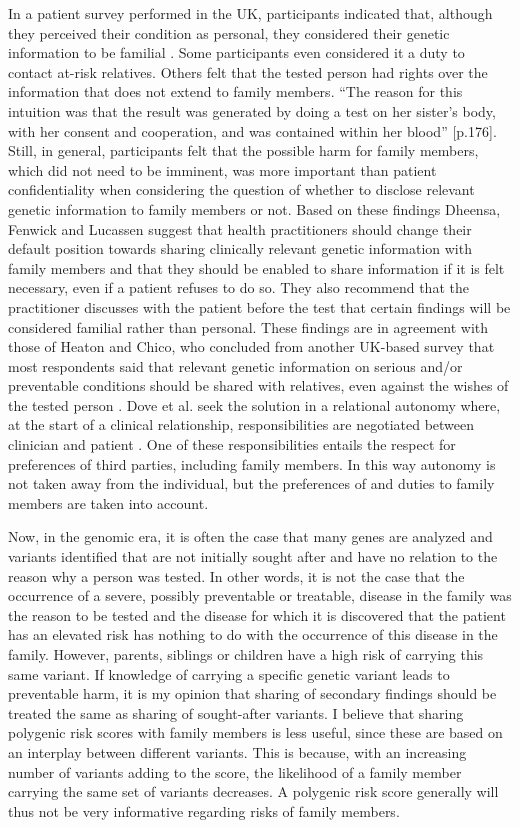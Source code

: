 In a patient survey performed in the UK, participants indicated that, although they perceived their condition as personal, they considered their genetic information to be familial \cite{Dheensa_2016}. 
Some participants even considered it a duty to contact at-risk relatives. 
Others felt that the tested person had rights over the information that does not extend to family members. 
“The reason for this intuition was that the result was generated by doing a test on her sister’s body, with her consent and cooperation, and was contained within her blood” \cite{Dheensa_2016}[p.176]. 
Still, in general, participants felt that the possible harm for family members, which did not need to be imminent, was more important than patient confidentiality when considering the question of whether to disclose relevant genetic information to family members or not. 
Based on these findings Dheensa, Fenwick and Lucassen suggest that health practitioners should change their default position towards sharing clinically relevant genetic information with family members and that they should be enabled to share information if it is felt necessary, even if a patient refuses to do so. 
They also recommend that the practitioner discusses with the patient before the test that certain findings will be considered familial rather than personal. 
These findings are in agreement with those of Heaton and Chico, who concluded from another UK-based survey that most respondents said that relevant genetic information on serious and/or preventable conditions should be shared with relatives, even against the wishes of the tested person \cite{Heaton_2015}. 
Dove et al. seek the solution in a relational autonomy where, at the start of a clinical relationship, responsibilities are negotiated between clinician and patient \cite{Dove_2017}. 
One of these responsibilities entails the respect for preferences of third parties, including family members. 
In this way autonomy is not taken away from the individual, but the preferences of and duties to family members are taken into account.

Now, in the genomic era, it is often the case that many genes are analyzed and variants identified that are not initially sought after and have no relation to the reason why a person was tested. 
In other words, it is not the case that the occurrence of a severe, possibly preventable or treatable, disease in the family was the reason to be tested and the disease for which it is discovered that the patient has an elevated risk has nothing to do with the occurrence of this disease in the family. 
However, parents, siblings or children have a high risk of carrying this same variant. If knowledge of carrying a specific genetic variant leads to preventable harm, it is my opinion that sharing of secondary findings should be treated the same as sharing of sought-after variants. 
I believe that sharing polygenic risk scores with family members is less useful, since these are based on an interplay between different variants. 
This is because, with an increasing number of variants adding to the score, the likelihood of a family member carrying the same set of variants decreases. 
A polygenic risk score generally will thus not be very informative regarding risks of family members.

